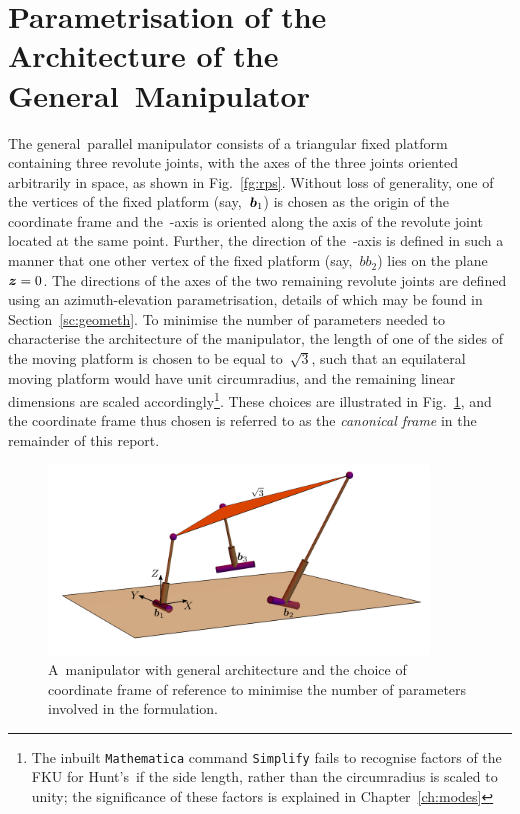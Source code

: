 \documentclass[DD]{iitmdiss}
\newcommand{\mref}[1]{\ref{#1}}
\newcommand{\mlabel}[1]{\label{#1}}
\begin{document}
\section{Parametrisation of the Architecture of the General~\rps Manipulator}\mlabel{sc:param}
%
The general~\rps parallel manipulator consists of a triangular fixed platform containing three revolute joints, with the axes of the three joints oriented arbitrarily in space, as shown in Fig.~\mref{fg:rps}. Without loss of generality, one of the vertices of the fixed platform (say,~$\bm{b}_1$) is chosen as the origin of the coordinate frame and the~\bY-axis is oriented along the axis of the revolute joint located at the same point. Further, the direction of the~\bZ-axis is defined in such a manner that one other vertex of the fixed platform (say,~$bb_2$) lies on the plane~\mbox{$\bm{z} = 0$}. The directions of the axes of the two remaining revolute joints are defined using an azimuth-elevation parametrisation, details of which may be found in Section~\mref{sc:geometh}. To minimise the number of parameters needed to characterise the architecture of the manipulator, the length of one of the sides of the moving platform is chosen to be equal to~$\sqrt{3}$, such that an equilateral moving platform  would have unit circumradius, and the remaining linear dimensions are scaled accordingly\footnote{The inbuilt \verb|Mathematica| command \verb|Simplify| fails to recognise factors of the FKU for Hunt's~\rps if the side length, rather than the circumradius is scaled to unity; the significance of these factors is explained in Chapter~\mref{ch:modes}}. These choices are illustrated in Fig.~\mref{fg:rpspar}, and the coordinate frame thus chosen is referred to as the \emph{canonical frame} in the remainder of this report.
\begin{figure}[h]
	\centering
	\includegraphics[width=0.9\textwidth]{rpspar.png}
	\caption{A~\rps manipulator with general architecture and the choice of coordinate frame of reference to minimise the number of parameters involved in the formulation.}
	\mlabel{fg:rpspar}
\end{figure}
% 
\end{document}

